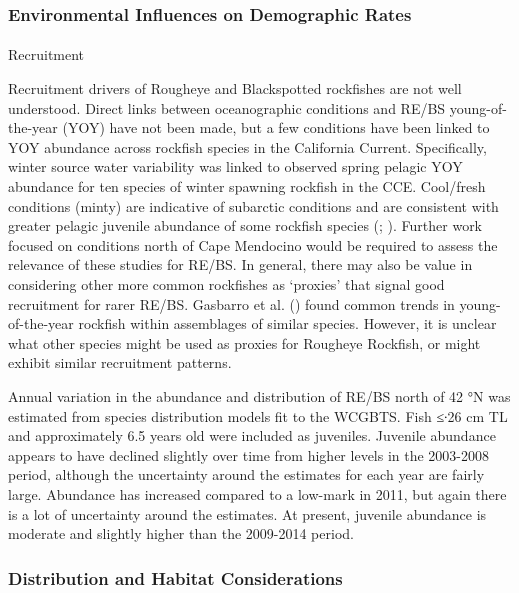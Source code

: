 \documentclass[
]{article}
\makeatletter
\let\oldparagraph\paragraph
\renewcommand{\paragraph}{
    \@ifstar
      \xxxParagraphStar
      \xxxParagraphNoStar
  }
\newcommand{\xxxParagraphStar}[1]{\oldparagraph*{#1}\mbox{}}
\newcommand{\xxxParagraphNoStar}[1]{\oldparagraph{#1}\mbox{}}
\makeatother
\begin{document}
\subsubsection{Environmental Influences on Demographic
Rates}\label{environmental-influences-on-demographic-rates}

\paragraph{Recruitment}\label{recruitment-1}

Recruitment drivers of Rougheye and Blackspotted rockfishes are not well
understood. Direct links between oceanographic conditions and RE/BS
young-of-the-year (YOY) have not been made, but a few conditions have
been linked to YOY abundance across rockfish species in the California
Current. Specifically, winter source water variability was linked to
observed spring pelagic YOY abundance for ten species of winter spawning
rockfish in the CCE. Cool/fresh conditions (minty) are indicative of
subarctic conditions and are consistent with greater pelagic juvenile
abundance of some rockfish species
(;
). Further work
focused on conditions north of Cape Mendocino would be required to
assess the relevance of these studies for RE/BS. In general, there may
also be value in considering other more common rockfishes as `proxies'
that signal good recruitment for rarer RE/BS. Gasbarro et al.
() found common trends in
young-of-the-year rockfish within assemblages of similar species.
However, it is unclear what other species might be used as proxies for
Rougheye Rockfish, or might exhibit similar recruitment patterns.

Annual variation in the abundance and distribution of RE/BS north of 42
°N was estimated from species distribution models fit to the WCGBTS.
Fish ≤∙26 cm TL and approximately 6.5 years old were included as
juveniles. Juvenile abundance appears to have declined slightly over
time from higher levels in the 2003-2008 period, although the
uncertainty around the estimates for each year are fairly large.
Abundance has increased compared to a low-mark in 2011, but again there
is a lot of uncertainty around the estimates. At present, juvenile
abundance is moderate and slightly higher than the 2009-2014 period.

\subsubsection{Distribution and Habitat
Considerations}\label{distribution-and-habitat-considerations}
\end{document}
